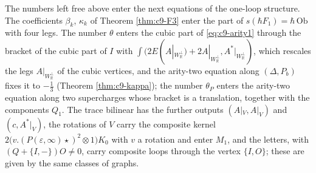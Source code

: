\begin{remark}
\label{rem:c9-next}
The numbers left free above enter the next equations of the one-loop structure. The coefficients $\beta_k$, $\kappa_k$ of Theorem \ref{thm:c9-F3} enter the part of $s(\hbar F_1)=\hbar\,\mathrm{Ob}$ with four legs. The number $\theta$ enters the cubic part of \eqref{eq:c9-arity1} through the bracket of the cubic part of $I$ with $\int(2E(A|_{W_{\mathbb R}^\perp})+2A|_{W_{\mathbb R}^\perp},A^*|_{W_{\mathbb R}^\perp})$, which rescales the legs $A|_{W_{\mathbb R}^\perp}$ of the cubic vertices, and the arity-two equation along $(\Delta,P_b)$ fixes it to $-\tfrac13$ (Theorem \ref{thm:c9-kappa}); the number $\theta_P$ enters the arity-two equation along two supercharges whose bracket is a translation, together with the components $Q_1$. The trace bilinear has the further outputs $(A|_V,A|_V)$ and $(c,A^*|_V)$, the rotations of $V$ carry the composite kernel $2\big(v.(P(\varepsilon,\infty)\star)^2\otimes1\big)K_0$ with $v$ a rotation and enter $M_1$, and the letters, with $(Q+\{I,-\})O\neq0$, carry composite loops through the vertex $\{I,O\}$; these are given by the same classes of graphs.
\end{remark}
